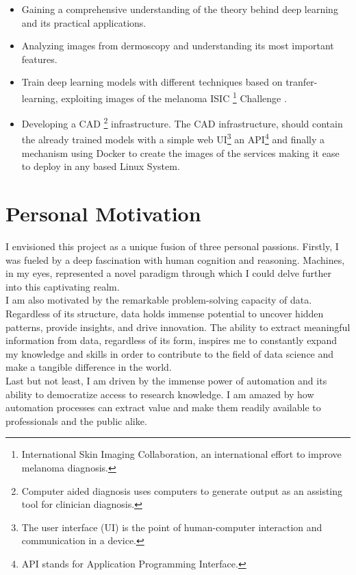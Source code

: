 \begin{itemize}
  \item Gaining a comprehensive understanding of the theory
    behind deep learning and its practical applications.
  \item Analyzing images
    from dermoscopy and understanding its most important features.
  \item Train
    deep learning models with different techniques based on tranfer-learning,
    exploiting images of the melanoma ISIC \footnote{International Skin Imaging
    Collaboration, an international effort to improve melanoma diagnosis.}
    Challenge \cite{IsicChallenge}.
  \item Developing a CAD \footnote{Computer aided
    diagnosis uses computers to generate output as an assisting tool for
    clinician diagnosis.} infrastructure. The CAD infrastructure, should
    contain the already trained models with a simple web UI\footnote{The user
    interface (UI) is the point of human-computer interaction and communication
    in a device.} an API\footnote{API stands for Application Programming
    Interface.} and finally a mechanism using Docker to create the images of the
    services making it ease to deploy in any based Linux System.
\end{itemize}

\section{Personal Motivation}

I envisioned this project as a unique fusion of three personal passions.
Firstly, I was fueled by a deep fascination with human cognition and reasoning.
Machines, in my eyes, represented a novel paradigm through which I could delve
further into this captivating realm. \\

I am also motivated by the remarkable problem-solving capacity of data.
Regardless of its structure, data holds immense potential to uncover hidden
patterns, provide insights, and drive innovation. The ability to extract
meaningful information from data, regardless of its form, inspires me to
constantly expand my knowledge and skills in order to contribute to the field
of data science and make a tangible difference in the world. \\

Last but not least, I am driven by the immense power of automation and its
ability to democratize access to research knowledge. I am amazed by how
automation processes can extract value and make them readily available to
professionals and the public alike.

